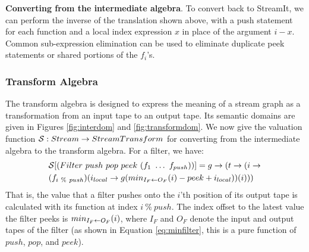 {\bf Converting from the intermediate algebra}.  To convert back to
StreamIt, we can perform the inverse of the translation shown above,
with a push statement for each function and a local index expression
$x$ in place of the argument $i-x$.  Common sub-expression elimination
can be used to eliminate duplicate peek statements or shared portions
of the $f_i$'s.

\subsubsection{Transform Algebra}

The transform algebra is designed to express the meaning of a stream
graph as a transformation from an input tape to an output tape.  Its
semantic domains are given in Figures \ref{fig:interdom} and
\ref{fig:transformdom}.  We now give the valuation function ${\cal S}:
Stream \ra StreamTransform$ for converting from the intermediate
algebra to the transform algebra.  For a filter, we have:
\begin{align*}
&{\cal S} [(Filter~push~pop~peek~(f_1~\dots~f_{push}))] = g \ra (t \ra
(i \ra \\ &(f_{i~\%~push})(i_{local} \ra g(\mi{I_F}{O_F}(i) - peek +
i_{local}))(i)))
\end{align*}
That is, the value that a filter pushes onto the $i$'th position of
its output tape is calculated with its function at index $i~\%~push$.
The index offset to the latest value the filter peeks is
$min_{I_F \leftarrow O_F}(i)$, where $I_F$ and $O_F$ denote the input and output
tapes of the filter (as shown in Equation \ref{eq:minfilter}, this is
a pure function of $push$, $pop$, and $peek$).

